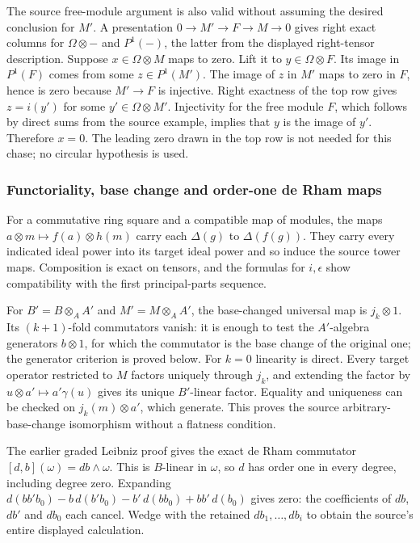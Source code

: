 The source free-module argument is also valid without assuming the desired conclusion for \(M'\). A presentation \(0\to M'\to F\to M\to0\) gives right exact columns for \(\Omega\otimes-\) and \(P^1(-)\), the latter from the displayed right-tensor description. Suppose \(x\in\Omega\otimes M\) maps to zero. Lift it to \(y\in\Omega\otimes F\). Its image in \(P^1(F)\) comes from some \(z\in P^1(M')\). The image of \(z\) in \(M'\) maps to zero in \(F\), hence is zero because \(M'\to F\) is injective. Right exactness of the top row gives \(z=i(y')\) for some \(y'\in\Omega\otimes M'\). Injectivity for the free module \(F\), which follows by direct sums from the source example, implies that \(y\) is the image of \(y'\). Therefore \(x=0\). The leading zero drawn in the top row is not needed for this chase; no circular hypothesis is used.

\subsubsection{Functoriality, base change and order-one de Rham maps}\label{functoriality-base-change-and-order-one-de-rham-maps}

For a commutative ring square and a compatible map of modules, the maps \(a\otimes m\mapsto f(a)\otimes h(m)\) carry each \(\Delta(g)\) to \(\Delta(f(g))\). They carry every indicated ideal power into its target ideal power and so induce the source tower maps. Composition is exact on tensors, and the formulas for \(i,\epsilon\) show compatibility with the first principal-parts sequence.

For \(B'=B\otimes_A A'\) and \(M'=M\otimes_A A'\), the base-changed universal map is \(j_k\otimes1\). Its \((k+1)\)-fold commutators vanish: it is enough to test the \(A'\)-algebra generators \(b\otimes1\), for which the commutator is the base change of the original one; the generator criterion is proved below. For \(k=0\) linearity is direct. Every target operator restricted to \(M\) factors uniquely through \(j_k\), and extending the factor by \(u\otimes a'\mapsto a'\gamma(u)\) gives its unique \(B'\)-linear factor. Equality and uniqueness can be checked on \(j_k(m)\otimes a'\), which generate. This proves the source arbitrary-base-change isomorphism without a flatness condition.

The earlier graded Leibniz proof gives the exact de Rham commutator \([d,b](\omega)=db\wedge\omega\). This is \(B\)-linear in \(\omega\), so \(d\) has order one in every degree, including degree zero. Expanding \(d(bb'b_0)-b\,d(b'b_0)-b'\,d(bb_0)+bb'\,d(b_0)\) gives zero: the coefficients of \(db\), \(db'\) and \(db_0\) each cancel. Wedge with the retained \(db_1,\ldots,db_i\) to obtain the source's entire displayed calculation.

